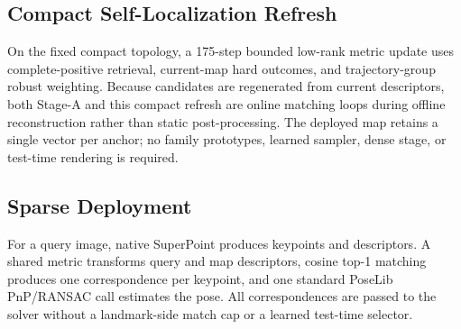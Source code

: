 \subsection{Compact Self-Localization Refresh}

On the fixed compact topology, a 175-step bounded low-rank metric update uses
complete-positive retrieval, current-map hard outcomes, and trajectory-group
robust weighting. Because candidates are regenerated from current descriptors,
both Stage-A and this compact refresh are online matching loops during offline
reconstruction rather than static post-processing. The deployed map retains a
single vector per anchor; no family prototypes, learned sampler, dense stage,
or test-time rendering is required.

\subsection{Sparse Deployment}

For a query image, native SuperPoint produces keypoints and descriptors. A
shared metric transforms query and map descriptors, cosine top-1 matching
produces one correspondence per keypoint, and one standard PoseLib PnP/RANSAC
call estimates the pose. All correspondences are passed to the solver without a
landmark-side match cap or a learned test-time selector.
